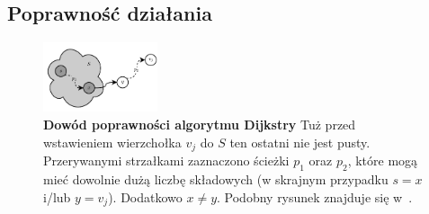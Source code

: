 \subsection{Poprawność działania}



\begin{figure}[!htbp]
	\centering
	\null\hfill
	\includegraphics[width=0.3\textwidth]{Chapter_II/ProofOfDijkstra/a.pdf}
    \hfill\null
	\caption{
		\textbf{Dowód poprawności algorytmu Dijkstry}
		Tuż przed wstawieniem wierzchołka $v_{j}$ do $S$ ten ostatni nie jest pusty.
		Przerywanymi strzałkami zaznaczono ścieżki $p_{1}$ oraz $p_{2}$, które mogą mieć dowolnie dużą liczbę składowych (w skrajnym przypadku $s = x$ i/lub $y = v_{j}$).
		Dodatkowo $x \neq y$.
		Podobny rysunek znajduje się w~\cite[$674$]{Cormen}.
	}
	\label{fig:proofOfDijkstra}
\end{figure}

